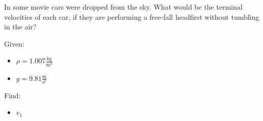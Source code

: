 
In some movie cars were dropped from the sky.
What would be the terminal velocities of each car, if they are
performing a free-fall headfirst without tumbling in the air?

\bigbreak Given:
\begin{itemize}
    \item $ \rho = 1.007 \frac{\text{kg}}{\text{m}^3} $
    \item $ g = 9.81 \frac{\text{m}}{\text{s}^2} $
\end{itemize}

Find:

\begin{itemize}
    \item $v_1$
\end{itemize}
